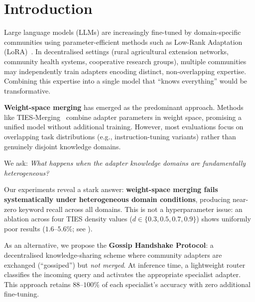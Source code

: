 \documentclass[conference, 10pt]{IEEEtran}
\begin{document}
\section{Introduction}
\label{sec:introduction}

Large language models (LLMs) are increasingly fine-tuned by domain-specific
communities using parameter-efficient methods such as Low-Rank Adaptation
(LoRA)~\cite{hu2022lora}.
In decentralised settings (rural agricultural extension networks, community
health systems, cooperative research groups), multiple communities may
independently train adapters encoding distinct, non-overlapping expertise.
Combining this expertise into a single model that ``knows everything''
would be transformative.

\textbf{Weight-space merging} has emerged as the predominant approach.
Methods like TIES-Merging~\cite{yadav2023ties} combine adapter parameters
in weight space, promising a unified model without additional training.
However, most evaluations focus on overlapping task distributions
(e.g., instruction-tuning variants) rather than genuinely disjoint
knowledge domains.

We ask: \emph{What happens when the adapter knowledge domains are
fundamentally heterogeneous?}

Our experiments reveal a stark answer: \textbf{weight-space merging fails
systematically under heterogeneous domain conditions}, producing near-zero keyword recall across all domains.
This is not a hyperparameter issue: an ablation across four TIES density
values ($d \in \{0.3, 0.5, 0.7, 0.9\}$) shows uniformly poor results
($1.6$--$5.6\%$; see ).

As an alternative, we propose the \textbf{Gossip Handshake Protocol}: a
decentralised knowledge-sharing scheme where community adapters are
exchanged (``gossiped'') but \emph{not merged}.
At inference time, a lightweight router classifies the incoming query and
activates the appropriate specialist adapter.
This approach retains $88$--$100\%$ of each specialist's accuracy with zero
additional fine-tuning.
\end{document}
